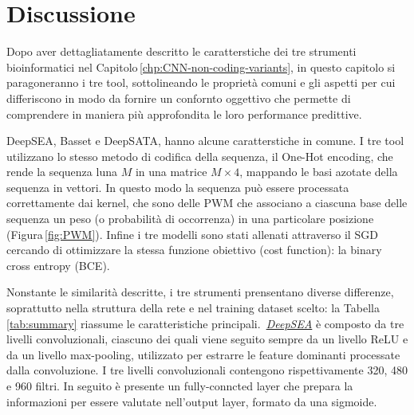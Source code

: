 
\chapter{Discussione}\label{chp:discussion}
% 
Dopo aver dettagliatamente descritto le caratterstiche dei tre strumenti bioinformatici nel Capitolo\,\ref{chp:CNN-non-coding-variants}, in questo capitolo si paragoneranno i tre tool, sottolineando le proprietà comuni e gli aspetti per cui differiscono in modo da fornire un confornto oggettivo che permette di comprendere in maniera più approfondita le loro performance predittive.

DeepSEA, Basset e DeepSATA, hanno alcune caratterstiche in comune. I tre tool utilizzano lo stesso metodo di codifica della sequenza, il One-Hot encoding, che rende la sequenza luna $M$ in una matrice $M\times 4$, mappando le basi azotate della sequenza in vettori. In questo modo la sequenza può essere processata correttamente dai kernel, che sono delle \acs{PWM} che associano a ciascuna base delle sequenza un peso (o probabilità di occorrenza) in una particolare posizione (Figura\,\ref{fig:PWM}). Infine i tre modelli sono stati allenati attraverso il \acs{SGD} cercando di ottimizzare la stessa funzione obiettivo (cost function): la binary cross entropy (\acs{BCE}).

\vspace{5px}

Nonstante le similarità descritte, i tre strumenti prensentano diverse differenze, soprattutto nella struttura della rete e nel training dataset scelto: la Tabella\,\ref{tab:summary} riassume le caratteristiche principali. \,\hyperref[sec:DeepSEA]{\textsl{DeepSEA}} è composto da tre livelli convoluzionali, ciascuno dei quali viene seguito sempre da un livello \acs{ReLU} e da un livello max-pooling, utilizzato per estrarre le feature dominanti processate dalla convoluzione. I tre livelli convoluzionali contengono rispettivamente 320, 480 e 960 filtri. In seguito è presente un fully-conncted layer che prepara la informazioni per essere valutate nell'output layer, formato da una sigmoide.

